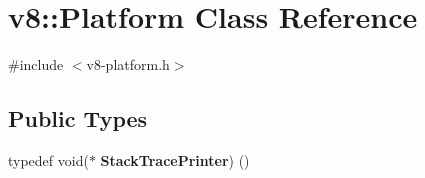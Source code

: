 \hypertarget{classv8_1_1Platform}{}\section{v8\+:\+:Platform Class Reference}
\label{classv8_1_1Platform}


{\ttfamily \#include $<$v8-\/platform.\+h$>$}

\subsection*{Public Types}
\begin{DoxyCompactItemize}
\item 
\mbox{\label{classv8_1_1Platform_aae7b558077a24b6ce9cacfe8e9320943}} 
typedef void($\ast$ {\bfseries Stack\+Trace\+Printer}) ()
\end{DoxyCompactItemize}
